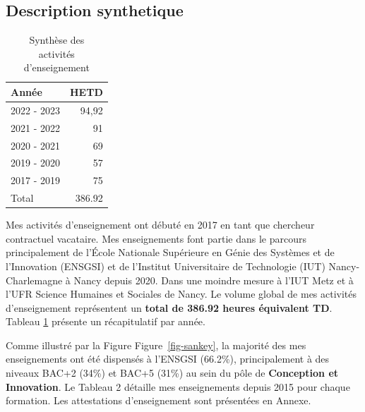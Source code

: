 \documentclass[
  11pt,
]{article}
\begin{document}
\hypertarget{description-synthetique}{%
\subsection{Description synthetique}\label{description-synthetique}}

\begin{table}
   \caption{\label{tbl-heures}Synthèse des\\activités d'enseignement}
   \begin{tabular}[t]{lr}
   \toprule
   Année & HETD\\
   \midrule
   2022 - 2023 & 94,92\\
   2021 - 2022 & 91\\
   2020 - 2021 & 69\\
   2019 - 2020 & 57\\
   2017 - 2019 & 75\\ \midrule
   Total & 386.92 \\
   \bottomrule
   \end{tabular}
\end{table}

Mes activités d'enseignement ont débuté en 2017 en tant que chercheur
contractuel vacataire. Mes enseignements font partie dans le parcours
principalement de l'École Nationale Supérieure en Génie des Systèmes et
de l'Innovation (ENSGSI) et de l'Institut Universitaire de Technologie
(IUT) Nancy-Charlemagne à Nancy depuis 2020. Dans une moindre mesure à
l'IUT Metz et à l'UFR Science Humaines et Sociales de Nancy. Le volume
global de mes activités d'enseignement représentent un \textbf{total de
386.92 heures équivalent TD}. Tableau \ref{tbl-heures} présente un
récapitulatif par année.

Comme illustré par la Figure Figure~\ref{fig-sankey}, la majorité des
mes enseignements ont été dispensés à l'ENSGSI (66.2\%), principalement
à des niveaux BAC+2 (34\%) et BAC+5 (31\%) au sein du pôle de
\textbf{Conception et Innovation}. Le Tableau 2 détaille mes
enseignements depuis 2015 pour chaque formation. Les attestations
d'enseignement sont présentées en Annexe.
\end{document}
